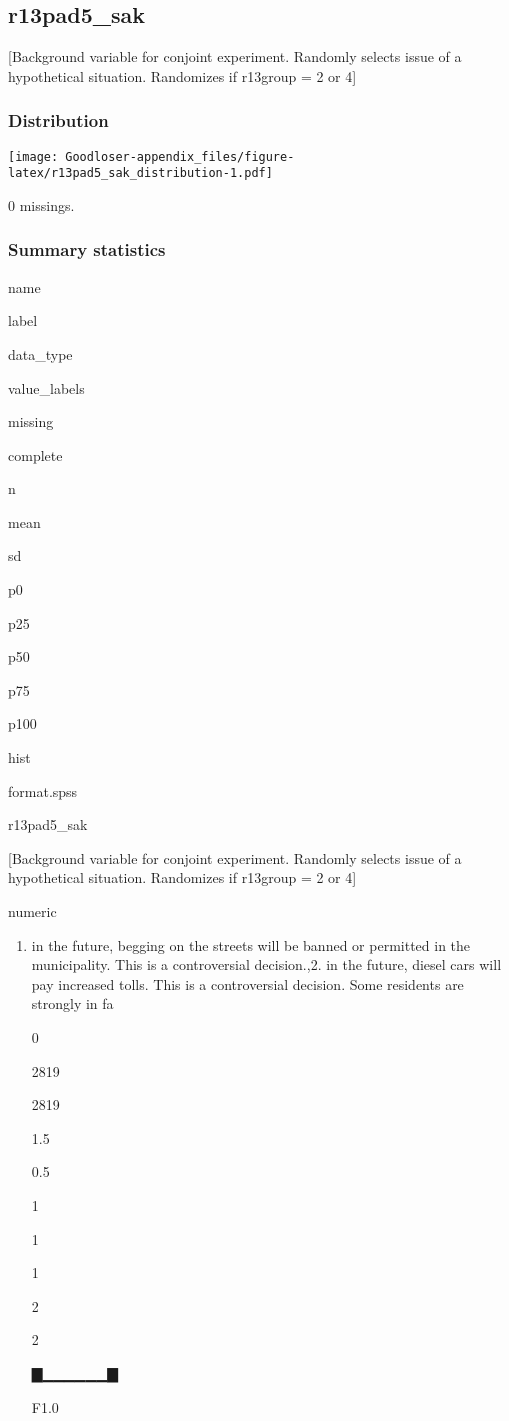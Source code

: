 \documentclass[]{book}
\providecommand{\tightlist}{%
  \setlength{\itemsep}{0pt}\setlength{\parskip}{0pt}}
\begin{document}
\subsection{r13pad5\_sak}\label{r13pad5_sak}

{[}Background variable for conjoint experiment. Randomly selects issue
of a hypothetical situation. Randomizes if r13group = 2 or 4{]}

\subsubsection{Distribution}\label{r13pad5_sak_distribution}

\texttt{[image: Goodloser-appendix\_files/figure-latex/r13pad5\_sak\_distribution-1.pdf]}

0 missings.

\subsubsection{Summary statistics}\label{r13pad5_sak_summary}

name

label

data\_type

value\_labels

missing

complete

n

mean

sd

p0

p25

p50

p75

p100

hist

format.spss

r13pad5\_sak

{[}Background variable for conjoint experiment. Randomly selects issue
of a hypothetical situation. Randomizes if r13group = 2 or 4{]}

numeric

\begin{enumerate}
\def\labelenumi{\arabic{enumi}.}
\tightlist
\item
  in the future, begging on the streets will be banned or permitted in
  the municipality. This is a controversial decision.,2. in the future,
  diesel cars will pay increased tolls. This is a controversial
  decision. Some residents are strongly in fa

  0

  2819

  2819

  1.5

  0.5

  1

  1

  1

  2

  2

  ▇▁▁▁▁▁▁▇

  F1.0
\end{enumerate}
\end{document}
